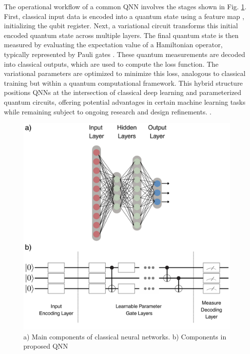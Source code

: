 \documentclass{article}
\begin{document}
The operational workflow of a common QNN involves the stages shown in Fig. \ref{fig:qnn1}. First, classical input data is encoded into a quantum state using a feature map \cite{kwon2024featuremapquantumdata}, initializing the qubit register. Next, a variational circuit transforms this initial encoded quantum state across multiple layers. The final quantum state is then measured by evaluating the expectation value of a Hamiltonian operator, typically represented by Pauli gates \cite{farhi2018classificationquantumneuralnetworks}. These quantum measurements are decoded into classical outputs, which are used to compute the loss function. The variational parameters are optimized to minimize this loss, analogous to classical training but within a quantum computational framework. This hybrid structure positions QNNs at the intersection of classical deep learning and parameterized quantum circuits, offering potential advantages in certain machine learning tasks while remaining subject to ongoing research and design refinements. \cite{qiskittheory}.

\begin{figure}[h!]
    \centering
    \includegraphics[scale=0.15]{figures/nns.png}
    \caption{a) Main components of classical neural networks. b) Components in proposed QNN}
    \label{fig:qnn1}
\end{figure}
\end{document}
